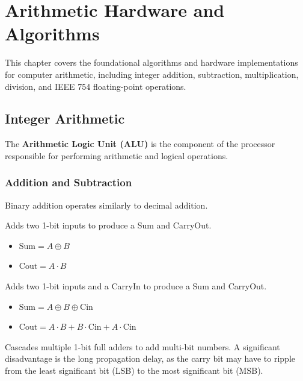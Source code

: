\chapter{Arithmetic Hardware and Algorithms}

This chapter covers the foundational algorithms and hardware implementations for computer arithmetic, including integer addition, subtraction, multiplication, division, and IEEE 754 floating-point operations.

\section{Integer Arithmetic}

\begin{vocabulary}[ALU]
The \textbf{Arithmetic Logic Unit (ALU)} is the component of the processor responsible for performing arithmetic and logical operations.
\end{vocabulary}

\subsection{Addition and Subtraction}

Binary addition operates similarly to decimal addition. 

\begin{definition}
Adds two 1-bit inputs to produce a Sum and CarryOut.
\begin{itemize}
    \item $\text{Sum} = A \oplus B$
    \item $\text{Cout} = A \cdot B$
\end{itemize}
\end{definition}

\begin{definition}
Adds two 1-bit inputs and a CarryIn to produce a Sum and CarryOut.
\begin{itemize}
    \item $\text{Sum} = A \oplus B \oplus \text{Cin}$
    \item $\text{Cout} = A \cdot B + B \cdot \text{Cin} + A \cdot \text{Cin}$
\end{itemize}
\end{definition}

\begin{definition}
Cascades multiple 1-bit full adders to add multi-bit numbers. A significant disadvantage is the long propagation delay, as the carry bit may have to ripple from the least significant bit (LSB) to the most significant bit (MSB).
\end{definition}

